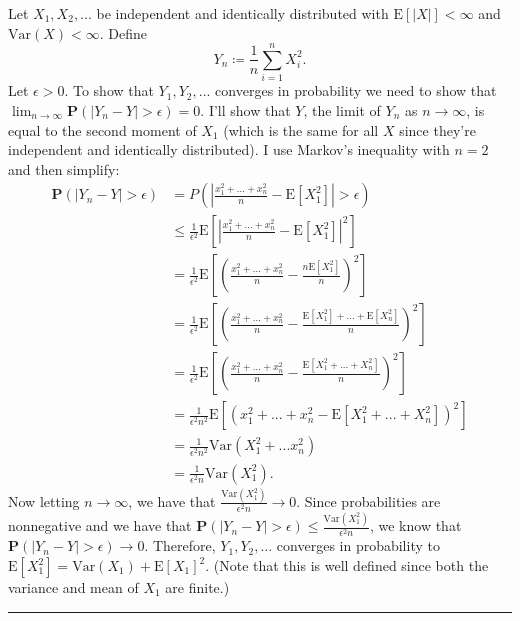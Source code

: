 \documentclass{article}
\theoremstyle{break}
\renewenvironment{proof}{{\bf Proof:}}{\hfill\rule{2mm}{2mm}}
\newcommand{\E}{\mathrm{E}}
\newcommand{\var}{\mathrm{Var}}
\renewcommand{\P}{\mathbf{P}}
\begin{document}
\begin{proof}
  Let $X_1, X_2, ...$ be independent and identically distributed with $\E[|X|] < \infty$ and $\var(X) < \infty$. Define
  \[
    Y_n \coloneqq \frac{1}{n} \sum_{i=1}^n X_i^2.
  \]
  Let $\epsilon > 0$. To show that $Y_1, Y_2, ...$ converges in probability we need to show that $\lim_{n \rightarrow \infty} \P(|Y_n - Y| > \epsilon) = 0$. I'll show that $Y$, the limit of $Y_n$ as $n \rightarrow \infty$, is equal to the second moment of $X_1$ (which is the same for all $X$ since they're independent and identically distributed). I use Markov's inequality with $n = 2$ and then simplify:
  \begin{align*}
    \P(|Y_n - Y| > \epsilon) &= P\left( \left| \frac{x_1^2 + ... + x_n^2}{n} - \E[X_1^2] \right| > \epsilon \right) \\
    &\leq \frac{1}{\epsilon^2} \E\left[ \left| \frac{x_1^2 + ... + x_n^2}{n} - \E[X_1^2] \right|^2 \right] \\
    &= \frac{1}{\epsilon^2} \E\left[ \left( \frac{x_1^2 + ... + x_n^2}{n} - \frac{n\E[X_1^2]}{n} \right)^2 \right] \\
    &= \frac{1}{\epsilon^2} \E\left[ \left( \frac{x_1^2 + ... + x_n^2}{n} - \frac{\E[X_1^2] + ... + \E[X_n^2]}{n} \right)^2 \right] \\
    &= \frac{1}{\epsilon^2} \E\left[ \left( \frac{x_1^2 + ... + x_n^2}{n} - \frac{\E[X_1^2 + ... + X_n^2]}{n} \right)^2 \right] \\
    &= \frac{1}{\epsilon^2 n^2} \E\left[ \left( x_1^2 + ... + x_n^2 - \E[X_1^2 + ... + X_n^2] \right)^2 \right] \\
    &= \frac{1}{\epsilon^2 n^2} \var(X_1^2 + ... x_n^2) \\
    &= \frac{1}{\epsilon^2 n} \var(X_1^2).
  \end{align*}
  Now letting $n \rightarrow \infty$, we have that $\frac{\var(X_1^2)}{\epsilon^2 n} \rightarrow 0$. Since probabilities are nonnegative and we have that $\P(|Y_n - Y| > \epsilon) \leq \frac{\var(X_1^2)}{\epsilon^2 n}$, we know that $\P(|Y_n - Y| > \epsilon) \rightarrow 0$. Therefore, $Y_1, Y_2, ...$ converges in probability to $\E[X_1^2] = \var(X_1) + \E[X_1]^2$. (Note that this is well defined since both the variance and mean of $X_1$ are finite.)
\end{proof}
\end{document}
